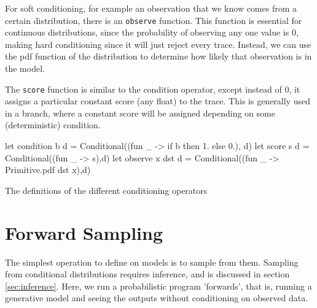 \begin{figure}[!htb]
	\begin{minipage}{0.5\textwidth}
		\label{lst:dice}
	\end{minipage}
	\begin{minipage}{0.5\textwidth}
		\label{lst:half_normal}
	\end{minipage}
\end{figure}

For soft conditioning, for example an observation that we know comes from a certain distribution, there is an \texttt{observe} function. This function is essential for continuous distributions, since the probability of observing any one value is 0, making hard conditioning since it will just reject every trace. Instead, we can use the pdf function of the distribution to determine how likely that observation is in the model.

The \texttt{score} function is similar to the condition operator, except instead of 0, it assigns a particular constant score (any float) to the trace. This is generally used in a branch, where a constant score will be assigned depending on some (deterministic) condition.
	
\begin{listing}[!htb]
	\centering
	\begin{ocamlcode-in}
let condition b d = Conditional((fun _ -> if b then 1. else 0.), d)
let score s d = Conditional((fun _ -> s),d)
let observe x dst d = Conditional((fun _ -> Primitive.pdf dst x),d) 
	\end{ocamlcode-in}	
	\caption{The definitions of the different conditioning operators}
	\label{lst:cond}
\end{listing}
	
\section{Forward Sampling}
The simplest operation to define on models is to sample from them. Sampling from conditional distributions requires inference, and is discussed in section \ref{sec:inference}. Here, we run a probabilistic program 'forwards', that is, running a generative model and seeing the outputs without conditioning on observed data.
		
